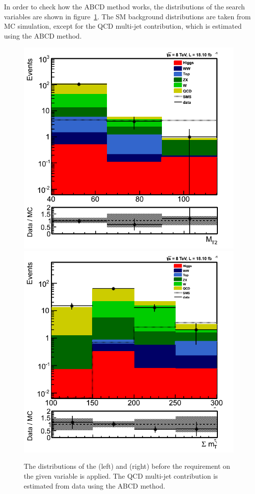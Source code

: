 In order to check how the ABCD method works, the distributions of the search variables are shown in 
figure~\ref{fig:5QCDbg}. The SM background distributions are taken from MC simulation, except for 
the QCD multi-jet contribution, which is estimated using the ABCD method.
\begin{figure}[iHhtb]
\centering
\includegraphics[angle=0,scale=0.35]{QCDbginTauTau/Bin1-QCDestimation.png}
\includegraphics[angle=0,scale=0.35]{QCDbginTauTau/Bin2-QCDestimation.png}
\caption{The distributions of the \mttwo (left) and \SumMT (right) before the requirement on the given variable
is applied. The QCD multi-jet contribution is estimated from data using the ABCD method.}
\label{fig:5QCDbg}
\end{figure}
